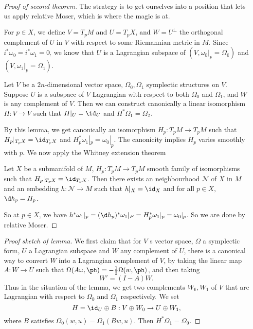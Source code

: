 \documentclass[a4paper]{article}
\begin{document}
\begin{proof}[Proof of second theorem]
  The strategy is to get ourselves into a position that lets us apply relative Moser, which is where the magic is at.

  For $p \in X$, we define $V = T_p M$ and $U = T_p X$, and $W = U^\perp$ the orthogonal complement of $U$ in $V$ with respect to some Riemannian metric in $M$. Since $i^* \omega_0 = i^* \omega_1 = 0$, we know that $U$ is a Lagrangian subspace of $(V, \omega_0|_p = \Omega_0)$ and $(V, \omega_1|_p = \Omega_1)$.

  \begin{lemma}
    Let $V$ be a $2n$-dimensional vector space, $\Omega_0, \Omega_1$ symplectic structures on $V$. Suppose $U$ is a subspace of $V$ Lagrangian with respect to both $\Omega_0$ and $\Omega_1$, and $W$ is any complement of $V$. Then we can construct canonically a linear isomorphism $H: V \to V$ such that $H|_U = \id_U$ and $H^* \Omega_1 = \Omega_2$.
  \end{lemma}
  By this lemma, we get canonically an isomorphism $H_p: T_p M \to T_p M$ such that $H_p|_{T_p X} = \id_{T_p X}$ and $H_p^* \omega_1|_p = \omega_0|_p$. The canonicity implies $H_p$ varies smoothly with $p$. We now apply the Whitney extension theorem
  \begin{thm}
    Let $X$ be a submanifold of $M$, $H_p: T_p M \to T_p M$ smooth family of isomorphisms such that $H_p|_{T_p X} = \id_{T_p X}$. Then there exists an neighbourhood $\mathcal{N}$ of $X$ in $M$ and an embedding $h: \mathcal{N} \to M$ such that $h|_X = \id_X$ and for all $p \in X$, $\d h_p = H_p$.
  \end{thm}
  So at $p \in X$, we have $h^* \omega_1|_p = (\d h_p)^*\omega_1|_P = H_p^* \omega_1|_p = \omega_0|_p$. So we are done by relative Moser.
\end{proof}

\begin{proof}[Proof sketch of lemma]
  We first claim that for $V$ s vector space, $\Omega$ a symplectic form, $U$ a Lagrangian subspace and $W$ any complement of $U$, there is a canonical way to convert $W$ into a Lagrangian complement of $V$, by taking the linear map $A: W \to U$ such that $\Omega(A\omega, \ph) = - \frac{1}{2} \Omega(w, \ph)$, and then taking %
  \[
    W' = (I - A) W.
  \]
  Thus in the situation of the lemma, we get two complements $W_0, W_1$ of $V$ that are Lagrangian with respect to $\Omega_0$ and $\Omega_1$ respectively. We set
  \[
    H = \id_U \oplus B: V \oplus W_0 \to U \oplus W_1,
  \]
  where $B$ satisfies $\Omega_0(w, u) = \Omega_1(Bw, u)$. Then $H^* \Omega_1 = \Omega_0$.
\end{proof}
\end{document}
